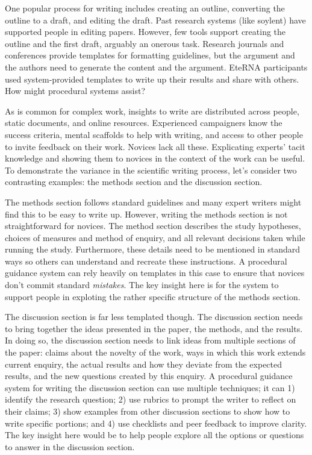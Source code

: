 
One popular process for writing includes creating an outline, converting the outline to a draft, and editing the draft. Past research systems (like soylent) have supported people in editing papers. However, few tools support creating the outline and the first draft, arguably an onerous task. Research journals and conferences provide templates for formatting guidelines, but the argument and the authors need to generate the content and the argument. EteRNA participants used system-provided templates to write up their results and share with others. How might procedural systems assist?

As is common for complex work, insights to write are distributed across people, static documents, and online resources. Experienced campaigners know the success criteria, mental scaffolds to help with writing, and access to other people to invite feedback on their work. Novices lack all these. Explicating experts' tacit knowledge and showing them to novices in the context of the work can be useful. To demonstrate the variance in the scientific writing process, let’s consider two contrasting examples: the methods section and the discussion section.

The methods section follows standard guidelines and many expert writers might find this to be easy to write up. However, writing the methods section is not straightforward for novices. The method section describes the study hypotheses, choices of measures and method of enquiry, and all relevant decisions taken while running the study. Furthermore, these details need to be mentioned in standard ways so others can understand and recreate these instructions. A procedural guidance system can rely heavily on templates in this case to ensure that novices don't commit standard \textit{mistakes}. The key insight here is for the system to support people in exploting the rather specific structure of the methods section.

The discussion section is far less templated though. The discussion section needs to bring together the ideas presented in the paper, the methods, and the results. In doing so, the discussion section needs to link ideas from multiple sections of the paper: claims about the novelty of the work, ways in which this work extends current enquiry, the actual results and how they deviate from the expected results, and the new questions created by this enquiry. A procedural guidance system for writing the discussion section can use multiple techniques; it can 1) identify the research question; 2) use rubrics to prompt the writer to reflect on their claims; 3) show examples from other discussion sections to show how to write specific portions; and 4) use checklists and peer feedback to improve clarity. The key insight here would be to help people explore all the options or questions to answer in the discussion section.

